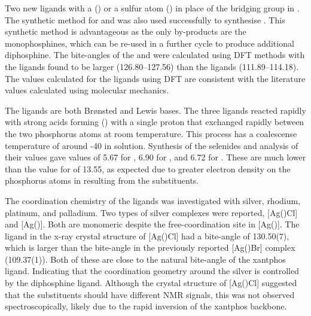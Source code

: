 Two new \tBuxantphos{} ligands with a  (\tBusixantphos) or a sulfur atom (\tButhixantphos) in place of the  bridging group in \tBuxantphos.  The synthetic method for \tBusixantphos{} and \tButhixantphos{} was also used successfully to synthesise \tBuxantphos{}.  This synthetic method is advantageous as the only by-products are the monophosphines, which can be re-used in a further cycle to produce additional diphosphine.  The bite-angles of the \tBuxantphos{} and \Phxantphos{} were calculated using \gls{DFT} methods with the \tBuxantphos{} ligands found to be larger (126.80--127.56\degrees{}) than the \Phxantphos{} ligands (111.89--114.18\degrees{}).  The values calculated for the \Phxantphos{} ligands using DFT are consistent with the literature values calculated using molecular mechanics.  

The \tBuxantphos{} ligands are both Br\o nsted and Lewis bases.  The three ligands reacted rapidly with strong acids forming (\tBuxantphos) with a single proton that exchanged rapidly between the two phosphorus atoms at room temperature.  This process has a coalescense temperature of around -40 \degC{} in solution.  Synthesis of the \tBuxantphos{} selenides and analysis of their \JPSe{} values gave \pKb{} values of 5.67 for \tBusixantphos, 6.90 for \tButhixantphos{}, and 6.72 for \tBuxantphos{}.  These are much lower than the value for \Phxantphos{} of 13.55, as expected due to greater electron density on the phosphorus atoms in \tBuxantphos{} resulting from the \tBu{} substituents.  

The coordination chemistry of the \tBuxantphos{} ligands was investigated with silver, rhodium, platinum, and palladium.  Two types of silver complexes were reported, [Ag(\tBuxantphos)Cl] and [Ag(\tBuxantphos)].  Both are monomeric despite the free-coordination site in [Ag(\tBuxantphos)].  The \tButhixantphos{} ligand in the x-ray crystal structure of [Ag(\tButhixantphos)Cl] had a bite-angle of 130.50(7)\degrees{}, which is larger than the bite-angle in the previously reported [Ag(\Phxantphos)Br] complex (109.37(1)\degrees{}).  Both of these are close to the natural bite-angle of the xantphos ligand.  Indicating that the coordination geometry around the silver is controlled by the diphosphine ligand.  Although the crystal structure of [Ag(\tButhixantphos)Cl] suggested that the \tBu{} substituents should have different NMR signals, this was not observed spectroscopically, likely due to the rapid inversion of the xantphos backbone.  

